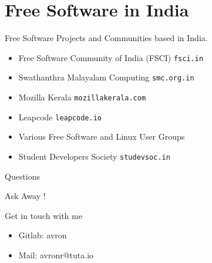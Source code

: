 \documentclass[presentation]{beamer}
\begin{document}
\section*{Free Software in India}
\label{sec:org249a78a}
\begin{frame}[label={sec:org2ba28a5},fragile]{Free Software Projects and Communities based in India.}
 \begin{itemize}
\item Free Software Community of India (FSCI) \texttt{fsci.in}
\item Swathanthra Malayalam Computing \texttt{smc.org.in}
\item Mozilla Kerala \texttt{mozillakerala.com}
\item Leapcode \texttt{leapcode.io}
\item Various Free Software and Linux User Groups
\item Student Developers Society \texttt{studevsoc.in}
\end{itemize}
\end{frame}
\begin{frame}[label={sec:org4351c6d}]{Questions}
\begin{block}{Ask Away !}
\end{block}
\end{frame}
\begin{frame}[label={sec:org6720cb7}]{Get in touch with me}
\begin{itemize}
\item Gitlab: avron
\item Mail: avronr@tuta.io
\end{itemize}
\end{frame}
\end{document}
